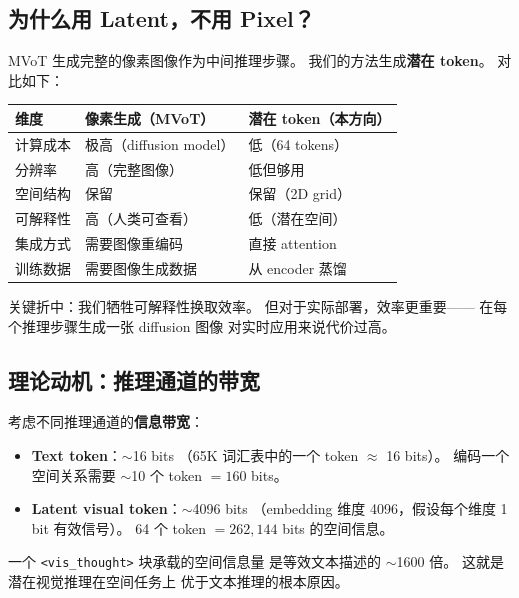 \documentclass[12pt,a4paper]{article}
\begin{document}
\subsection{为什么用 Latent，不用 Pixel？}

MVoT 生成完整的像素图像作为中间推理步骤。
我们的方法生成\textbf{潜在 token}。
对比如下：

\begin{table}[h]
\centering
\small
\begin{tabular}{lll}
\toprule
\textbf{维度} & \textbf{像素生成（MVoT）} & \textbf{潜在 token（本方向）} \\
\midrule
计算成本 & 极高（diffusion model） & 低（64 tokens） \\
分辨率 & 高（完整图像） & 低但够用 \\
空间结构 & 保留 & 保留（2D grid） \\
可解释性 & 高（人类可查看） & 低（潜在空间） \\
集成方式 & 需要图像重编码 & 直接 attention \\
训练数据 & 需要图像生成数据 & 从 encoder 蒸馏 \\
\bottomrule
\end{tabular}
\end{table}

\noindent
关键折中：我们牺牲可解释性换取效率。
但对于实际部署，效率更重要——
在每个推理步骤生成一张 diffusion 图像
对实时应用来说代价过高。

\subsection{理论动机：推理通道的带宽}

考虑不同推理通道的\textbf{信息带宽}：

\begin{itemize}[leftmargin=2em]
  \item \textbf{Text token}：$\sim$16 bits
    （65K 词汇表中的一个 token $\approx$ 16 bits）。
    编码一个空间关系需要 $\sim$10 个 token $= 160$ bits。
  \item \textbf{Latent visual token}：$\sim$4096 bits
    （embedding 维度 4096，假设每个维度 1 bit 有效信号）。
    64 个 token $= 262,144$ bits 的空间信息。
\end{itemize}

\noindent
一个 \texttt{<vis\_thought>} 块承载的空间信息量
是等效文本描述的 $\sim$1600 倍。
这就是潜在视觉推理在空间任务上
优于文本推理的根本原因。
\end{document}
